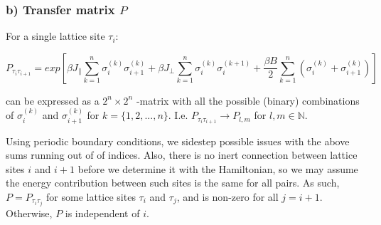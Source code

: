 \documentclass[11pt]{article}
\begin{document}
    \subsubsection{\texorpdfstring{b) Transfer matrix
\(P\)}{b) Transfer matrix P}}\label{b-transfer-matrix-p}

For a single lattice site \(\tau_{i}\):

\begin{equation}
    P_{\tau_{i}\tau_{i+1}} = exp\left[\beta J_{\parallel} \sum_{k=1}^{n} \sigma_{i}^{(k)}\sigma_{i+1}^{(k)} + \beta J_{\perp} \sum_{k=1}^{n}\sigma_{i}^{(k)}\sigma_{i}^{(k+1)} + \frac{\beta B}{2}\sum_{k=1}^{n}(\sigma_{i}^{(k)}+\sigma_{i+1}^{(k)})\right]
\end{equation}

can be expressed as a \(2^{n}\times2^{n}\) -matrix with all the possible
(binary) combinations of \(\sigma_{i}^{(k)}\) and \(\sigma_{i+1}^{(k)}\)
for \(k=\{1, 2, ..., n\}\). I.e.
\(P_{\tau_{i}\tau_{i+1}} \rightarrow P_{l,m}\) for
\(l, m \in \mathbb{N}\).

Using periodic boundary conditions, we sidestep possible issues with the
above sums running out of of indices. Also, there is no inert connection
between lattice sites \(i\) and \(i+1\) before we determine it with the
Hamiltonian, so we may assume the energy contribution between such sites
is the same for all pairs. As such, \(P = P_{\tau_{i}\tau_{j}}\) for
some lattice sites \(\tau_{i}\) and \(\tau_{j}\), and is non-zero for
all \(j=i+1\). Otherwise, \(P\) is independent of \(i\).
\end{document}
